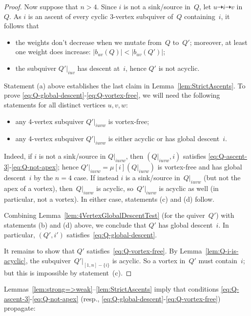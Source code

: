 \documentclass[11pt, letterpaper]{amsart}
\theoremstyle{definition}
\numberwithin{equation}{section}
\newcommand{\T}[2]{\mu[#1](#2)} %
\newcommand{\points}{\!\dasharrow\!}
\begin{document}
\begin{proof}
\pagebreak[3]

Now suppose that $n > 4$. 
Since $i$ is not a sink/source in~$Q$, let $u\points i\points v$ in~$Q$.
As $i$ is an ascent of every cyclic $3$-vertex subquiver of~$Q$ containing~$i$,
it follows that 
\begin{itemize}[leftmargin=.3in]
\item[{\rm (a)}]
 the weights don't decrease when we mutate from~$Q$ to~$Q'$;
moreover, at least one weight does increase: $|b_{uv}(Q)| < |b_{uv}(Q')|$;
\item[{\rm (b)}]
the subquiver $Q'|_{iuv}$ has descent at~$i$, hence $Q'$ is not acyclic.
\end{itemize}
Statement (a) above establishes the last claim in Lemma~\ref{lem:StrictAscents}. 
To prove \eqref{eq:Q-global-descent}-\eqref{eq:Q-vortex-free}, we will need the following statements for all distinct vertices $u,v,w$: 
\begin{itemize}[leftmargin=.3in]
\item[{\rm (c)}]
any 4-vertex subquiver $Q'|_{iuvw}$ is vortex-free; 
\item[{\rm (d)}]
any 4-vertex subquiver $Q'|_{iuvw}$ is either acyclic or has global descent~$i$.
\end{itemize}
Indeed, if $i$ is not a sink/source in $Q|_{iuvw}$, then $(Q|_{iuvw}, i)$ satisfies \eqref{eq:Q-ascent-3}-\eqref{eq:Q-not-apex}; %
hence $Q'|_{iuvw}= \T{i}{Q|_{iuvw}}$ is vortex-free and has global descent~$i$ by the $n=4$ case. 
If instead $i$ is a sink/source in~$Q|_{iuvw}$ (but not the apex of a vortex), then~$Q|_{iuvw}$ is acyclic,
so~$Q'|_{iuvw}$ is acyclic as well (in particular, not a vortex). 
In either case, statements (c) and (d) follow.

Combining Lemma~\ref{lem:4VertexGlobalDescentTest} (for the quiver~$Q'$)
with statements (b) and (d) above,
we conclude that $Q'$ has global descent~$i$. 
In particular, $(Q', i')$ satisfies~\eqref{eq:Q-global-descent}.

It remains to show that $Q'$ satisfies~\eqref{eq:Q-vortex-free}. %
By Lemma~\ref{lem:Q-i-is-acyclic}, the subquiver~$Q'|_{[1,n]-\{i\}}$ is acyclic. 
So a vortex in~$Q'$ must contain~$i$; but this is impossible by statement~(c). 
\end{proof}

Lemmas~\ref{lem:strong=>weak}--\ref{lem:StrictAscents} imply that conditions \eqref{eq:Q-ascent-3}-\eqref{eq:Q-not-apex}
(resp., \eqref{eq:Q-global-descent}-\eqref{eq:Q-vortex-free})
propagate: 
\end{document}
